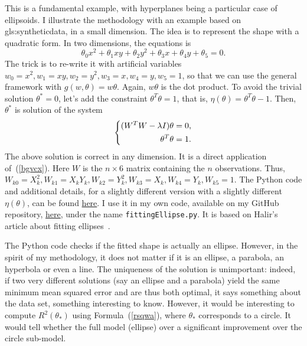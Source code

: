 \documentclass[oneside,10pt]{book}
\begin{document}
This is a fundamental example, with hyperplanes being a particular case of ellipsoids. I illustrate the methodology with an example based on \gls{gls:syntheticdata}, in a small dimension. The idea is to represent the shape with a quadratic form. In two dimensions, the equations is 
$$
\theta_0 x^2 + \theta_1 xy + \theta_2 y^2 + \theta_3 x + \theta_4 y + \theta_5=0.
$$
The trick is to re-write it with artificial variables $w_0=x^2, w_1=xy,w_2=y^2, w_3=x,w_4=y,w_5=1$, so that we can use the general framework
 with $g(w,\theta)=w\theta$. Again, $w\theta$ is the dot product. To avoid the trivial solution $\theta^*=0$, let's add the constraint
 $\theta^T\theta=1$, that is, $\eta(\theta)=\theta^T\theta-1$. Then, $\theta^*$ is solution of  the system
\begin{equation}
\centering
\left\{\begin{split}
( W^TW -\lambda I)\theta & =0, \\
 \theta^T\theta & =1. \\
\end{split}\right. \label{bgvcx2} %
\end{equation}
The above solution is correct in any dimension. It is a direct application of~(\ref{bgvcx}). Here $W$ is the $n \times 6$ matrix containing the $n$ observations. Thus, $W_{k0}=X_k^2, W_{k1}=X_kY_k, W_{k2}=Y_k^2,  W_{k3}=X_k, W_{k4}=Y_k, W_{k5}=1$. The Python code and additional details, for a slightly different version with a slightly different $\eta(\theta)$, can be found \href{https://scipython.com/blog/direct-linear-least-squares-fitting-of-an-ellipse/}{here}. I use it in my own code, available on my GitHub repository, \href{https://github.com/VincentGranville/Machine-Learning/blob/main/Source\%20Code/fittingEllipse.py}{here}, under the name \texttt{fittingEllipse.py}.  It is based on Halir's article about fitting ellipses~\cite{Halir98numericallystable}.

The Python code checks if the fitted shape is actually an ellipse. However, in the spirit of my methodology, it does not matter if it is an ellipse, a parabola, an hyperbola or even a line. The uniqueness of the solution is unimportant: indeed, if two very different solutions (say an ellipse and a 
 parabola) yield the same minimum mean squared error and are thus both optimal, it says something about the data set, 
 something interesting to know.   However, it would be interesting to compute $R^2(\theta_*)$ using
 Formula~(\ref{rsqwa}), where $\theta_*$ corresponds to a circle. It would tell
 whether the full model (ellipse) over a significant improvement over the circle sub-model.
\end{document}
